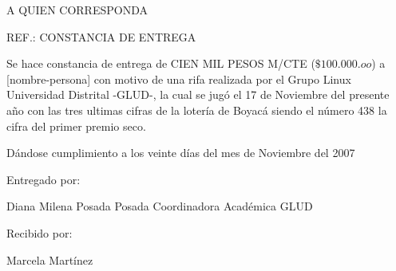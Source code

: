 A QUIEN CORRESPONDA


REF.: CONSTANCIA DE ENTREGA





Se hace constancia de entrega de CIEN MIL PESOS M/CTE ($\$100.000.oo$) a [nombre-persona] con motivo de una rifa realizada por el Grupo Linux Universidad Distrital -GLUD-, la cual se jugó el 17 de Noviembre del presente año con las tres ultimas cifras de la lotería de Boyacá siendo el número 438 la cifra del primer premio seco.


Dándose cumplimiento a los veinte días del mes de Noviembre del 2007


Entregado por:				  




Diana Milena Posada Posada
Coordinadora Académica GLUD



 Recibido por:

Marcela Martínez

